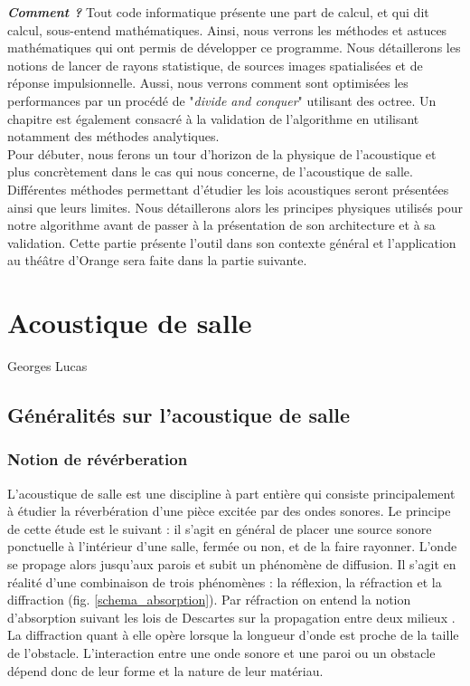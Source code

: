 \textit{\textbf{Comment ?}} Tout code informatique présente une part de calcul, et qui dit calcul, sous-entend mathématiques. Ainsi, nous verrons les méthodes et astuces mathématiques qui ont permis de développer ce programme. Nous détaillerons les notions de lancer de rayons statistique, de sources images spatialisées et de réponse impulsionnelle. Aussi, nous verrons comment sont optimisées les performances par un procédé de "\textit{divide and conquer}" utilisant des \gls{octree}. Un chapitre est également consacré à la validation de l'algorithme en utilisant notamment des méthodes analytiques.\\

Pour débuter, nous ferons un tour d'horizon de la physique de l'acoustique et plus concrètement dans le cas qui nous concerne, de l'acoustique de salle. Différentes méthodes permettant d'étudier les lois acoustiques seront présentées ainsi que leurs limites. Nous détaillerons alors les principes physiques utilisés pour notre algorithme avant de passer à la présentation de son architecture et à sa validation. Cette partie présente l'outil dans son contexte général et l'application au théâtre d'Orange sera faite dans la partie suivante.







\chapter{Acoustique de salle}
			{Georges Lucas}
		\minitoc
		\newpage
			
		
\section{Généralités sur l'acoustique de salle}
\subsection{Notion de révérberation}
L'acoustique de salle est une discipline à part entière qui consiste principalement à étudier la réverbération d'une pièce excitée par des ondes sonores. Le principe de cette étude est le suivant : il s'agit en général de placer une source sonore ponctuelle à l'intérieur d'une salle, fermée ou non, et de la faire rayonner. L'onde se propage alors jusqu'aux parois et subit un phénomène de diffusion. Il s'agit en réalité d'une combinaison de trois phénomènes : la réflexion, la réfraction et la diffraction (fig. \ref{schema_absorption}). Par réfraction on entend la notion d'absorption suivant les lois de Descartes sur la propagation entre deux milieux \cite[p. 3]{jouhaneau}. La diffraction quant à elle opère lorsque la longueur d'onde est proche de la taille de l'obstacle. L'interaction entre une onde sonore et une paroi ou un obstacle dépend donc de leur forme et la nature de leur matériau.

